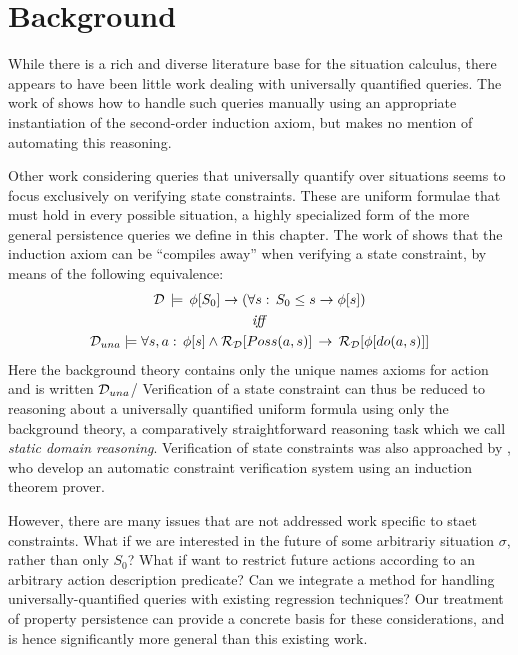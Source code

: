 \section{Background\label{sec:Persistence:Background}}

While there is a rich and diverse literature base for the situation
calculus, there appears to have been little work dealing with universally
quantified queries. The work of \citet{Reiter93proving} shows how
to handle such queries manually using an appropriate instantiation
of the second-order induction axiom, but makes no mention of automating
this reasoning.

Other work considering queries that universally quantify over situations
seems to focus exclusively on verifying state constraints. These are
uniform formulae that must hold in every possible situation, a highly
specialized form of the more general persistence queries we define
in this chapter. The work of \citet{Lin94-StateConstraints} shows
that the induction axiom can be {}``compiles away'' when verifying
a state constraint, by means of the following equivalence:\begin{gather*}
\mathcal{D}\,\models\,\phi[S_{0}]\rightarrow\left(\forall s:\, S_{0}\leq s\rightarrow\phi[s]\right)\\
\mathit{iff}\\
\mathcal{D}_{una}\models\forall s,a:\,\phi[s]\wedge\mathcal{R}_{\mathcal{D}}[Poss(a,s)]\,\rightarrow\,\mathcal{R}_{\mathcal{D}}[\phi[do(a,s)]]\end{gather*}
 Here the background theory contains only the unique names axioms
for action and is written $\mathcal{D}_{una}$/ Verification of a state constraint
can thus be reduced to reasoning about a universally quantified uniform
formula using only the background theory, a comparatively straightforward
reasoning task which we call \emph{static domain reasoning}. Verification
of state constraints was also approached by \citet{bertossi96automating},
who develop an automatic constraint verification system using an induction
theorem prover.

However, there are many issues that are not addressed work specific
to staet constraints. What if we are interested in the future of some
arbitrariy situation $\sigma$, rather than only $S_{0}$? What if
want to restrict future actions according to an arbitrary action description
predicate? Can we integrate a method for handling universally-quantified
queries with existing regression techniques? Our treatment of property
persistence can provide a concrete basis for these considerations,
and is hence significantly more general than this existing work.

